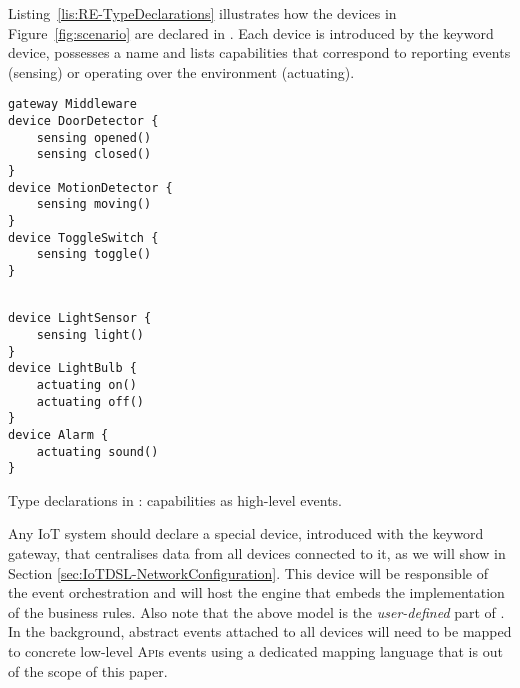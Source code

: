 Listing~\ref{lis:RE-TypeDeclarations} illustrates how the devices in Figure~\ref{fig:scenario} are declared in \IOTDSL. Each device is introduced by the keyword \textsf{device}, possesses a name and lists capabilities that correspond to reporting events (\textsf{sensing}) or operating over the environment (\textsf{actuating}). 

\begin{table}
	\begin{minipage}[b]{.45\textwidth }%
		\begin{lstlisting}[language=iotdsl]	
gateway Middleware
device DoorDetector {
	sensing opened()
	sensing closed()
}
device MotionDetector {
	sensing moving()
}
device ToggleSwitch {
	sensing toggle()
}
		\end{lstlisting}
	\end{minipage}\hfill%
	\begin{minipage}[b]{.45\textwidth}
		\begin{lstlisting}[language=iotdsl, firstnumber=12]
		
device LightSensor {
	sensing light()
}
device LightBulb {
	actuating on()
	actuating off()
}	
device Alarm {
	actuating sound()
}
		\end{lstlisting}
	\end{minipage}
	\caption{Type declarations in \IOTDSL: capabilities as high-level events.}
	\label{lis:RE-TypeDeclarations}
\end{table}

Any IoT system should declare a special device, introduced with the keyword \textsf{gateway}, that centralises data from all devices connected to it, as we will show in Section \ref{sec:IoTDSL-NetworkConfiguration}. This device will be responsible of the event orchestration and will host the \CEP engine that embeds the implementation of the business rules. Also note that the above model is the \textit{user-defined} part of \IOTDSL. In the background, abstract events attached to all devices will need to be mapped to concrete low-level \textsc{Api}s events using a dedicated mapping language that is out of the scope of this paper.


